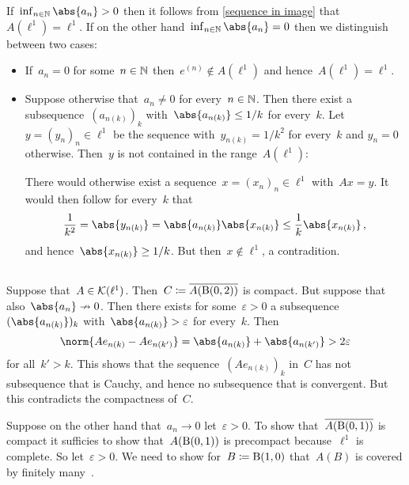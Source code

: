 If~$\inf_{n \in \Natural} \abs{a_n} > 0$ then it follows from \cref{sequence in image} that~$A(\ell^1) = \ell^1$.
If on the other hand~$\inf_{n \in \Natural} \abs{a_n} = 0$ then we distinguish between two cases:
\begin{itemize}
  \item
    If~$a_n = 0$ for some~$n \in \Natural$ then~$e^{(n)} \notin A(\ell^1)$ and hence~$A(\ell^1) = \ell^1$.
  \item
    Suppose otherwise that~$a_n \neq 0$ for every~$n \in \Natural$.
    Then there exist a subsequence~$(a_{n(k)})_k$ with~$\abs{a_{n(k)}} \leq 1/k$ for every~$k$.
    Let~$y = (y_n)_n \in \ell^1$ be the sequence with~$y_{n(k)} = 1/k^2$ for every~$k$ and $y_n = 0$ otherwise.
    Then~$y$ is not contained in the range~$A(\ell^1)$:
    
    There would otherwise exist a sequence~$x = (x_n)_n \in \ell^1$ with~$Ax = y$.
    It would then follow for every~$k$ that
    \[
            \frac{1}{k^2}
      =     \abs{ y_{n(k)} }
      =     \abs{ a_{n(k)} } \abs{ x_{n(k)} }
      \leq  \frac{1}{k} \abs{ x_{n(k)} } \,,
    \]
    and hence~$\abs{ x_{n(k)} } \geq 1/k$.
    But then~$x \notin \ell^1$, a contradition.
\end{itemize}





\subsection{}

Suppose that~$A \in \Compact(\ell^1)$.
Then~$C \defined \closure{A(\ball{2}{0})}$ is compact.
But suppose that also~$\abs{a_n} \nto 0$.
Then there exists for some~$\varepsilon > 0$ a subsequence~$(\abs{a_{n(k)}})_k$ with~$\abs{a_{n(k)}} > \varepsilon$ for every~$k$.
Then
\[
    \norm{ A e_{n(k)} - A e_{n(k')} }
  = \abs{ a_{n(k)} } + \abs{ a_{n(k')} }
  > 2 \varepsilon
\]
for all~$k' > k$.
This shows that the sequence~$( A e_{n(k)} )_k$ in~$C$ has not subsequence that is Cauchy, and hence no subsequence that is convergent.
But this contradicts the compactness of~$C$.

Suppose on the other hand that~$a_n \to 0$ let~$\varepsilon > 0$.
To show that~$\closure{A(\ball{1}{0})}$ is compact it sufficies to show that~$A(\ball{1}{0})$ is precompact because~$\ell^1$ is complete.
So let~$\varepsilon > 0$.
We need to show for~$B \defined \ball{0}{1}$ that~$A(B)$ is covered by finitely many~.

